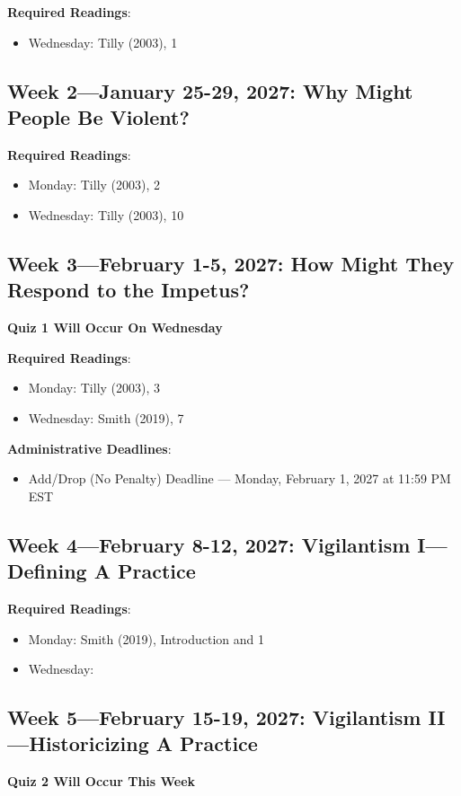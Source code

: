 \documentclass[12pt]{article}
\begin{document}
\textbf{Required Readings}:
\begin{itemize}
    \item Wednesday: Tilly (2003), 1
\end{itemize}

\subsection*{Week 2---January 25-29, 2027: Why Might People Be Violent?}

\textbf{Required Readings}:
\begin{itemize}
    \item Monday: Tilly (2003), 2
    \item Wednesday: Tilly (2003), 10

\end{itemize}

\subsection*{Week 3---February 1-5, 2027: How Might They Respond to the Impetus?}
\textbf{Quiz 1 Will Occur On Wednesday}

\textbf{Required Readings}:
\begin{itemize}
    \item Monday: Tilly (2003), 3
    \item Wednesday: Smith (2019), 7
\end{itemize}

\textbf{Administrative Deadlines}:
\begin{itemize}
    \item Add/Drop (No Penalty) Deadline --- Monday, February 1, 2027 at 11:59 PM EST
\end{itemize}

\subsection*{Week 4---February 8-12, 2027: Vigilantism I---Defining A Practice}

\textbf{Required Readings}:
\begin{itemize}
    \item Monday: Smith (2019), Introduction and 1
    \item Wednesday: 
\end{itemize}

\subsection*{Week 5---February 15-19, 2027: Vigilantism II---Historicizing A Practice}
\textbf{Quiz 2 Will Occur This Week}
\end{document}
